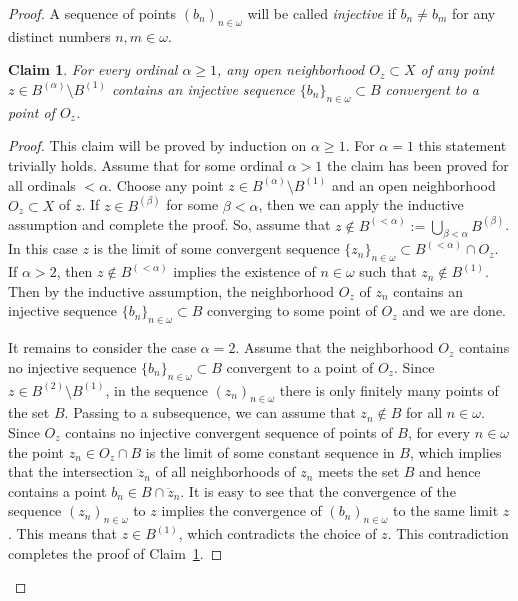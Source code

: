 \documentclass{amsart}
\newtheorem{claim}[theorem]{Claim}
\theoremstyle{definition}
\begin{document}
\begin{proof}
A sequence of points $(b_n)_{n\in{\omega}}$ will be called {\em injective} if $b_n\ne b_m$ for any distinct numbers $n,m\in{\omega}$.

\begin{claim}\label{cl1.8} For every ordinal $\alpha\ge 1$, any open neighborhood $O_z\subset X$ of any point $z\in B^{(\alpha)}\setminus B^{(1)}$ contains an injective sequence $\{b_n\}_{n\in{\omega}}\subset B$ convergent to a point of $O_z$.
\end{claim}

\begin{proof} This claim will be proved by induction on $\alpha\ge 1$.
For $\alpha=1$ this statement trivially holds. Assume that for some ordinal $\alpha>1$ the claim has been proved for all ordinals $<\alpha$. Choose any point $z\in B^{(\alpha)}\setminus B^{(1)}$ and an open neighborhood $O_z\subset X$ of $z$. If $z\in B^{(\beta)}$ for some $\beta<\alpha$, then we can apply the inductive assumption and complete the proof.  So, assume that $z\notin B^{(<\alpha)}:=\bigcup_{\beta<\alpha}B^{(\beta)}$. In this case $z$ is the limit of some convergent sequence $\{z_n\}_{n\in{\omega}}\subset B^{(<\alpha)}\cap O_z$. If $\alpha>2$, then $z\notin B^{(<\alpha)}$ implies the existence of $n\in{\omega}$ such that $z_n\notin B^{(1)}$. Then by the inductive assumption, the neighborhood $O_z$ of $z_n$ contains an injective sequence $\{b_n\}_{n\in{\omega}}\subset B$ converging to some point of $O_z$ and we are done.

It remains to consider the case $\alpha=2$. Assume that the neighborhood $O_z$ contains no injective sequence $\{b_n\}_{n\in{\omega}}\subset B$ convergent to a point of $O_z$. Since $z\in B^{(2)}\setminus B^{(1)}$, in the sequence $(z_n)_{n\in{\omega}}$ there is only finitely many points of the set $B$. Passing to a subsequence, we can assume that $z_n\notin B$ for all $n\in{\omega}$. Since $O_z$ contains no injective convergent sequence of points of $B$, for every $n\in{\omega}$ the point $z_n\in O_z\cap B$ is the limit of some constant sequence in $B$, which implies that the intersection $\ddot{z}_n$ of all neighborhoods of $z_n$ meets the set $B$ and hence contains a point $b_n\in B\cap \ddot{z}_n$. It is easy to see that the convergence of the sequence $(z_n)_{n\in{\omega}}$ to $z$ implies the convergence of $(b_n)_{n\in{\omega}}$ to the same limit $z$. This means that $z\in B^{(1)}$, which contradicts the choice of $z$.
This contradiction completes the proof of Claim~\ref{cl1.8}.
\end{proof}


\end{proof}
\end{document}

